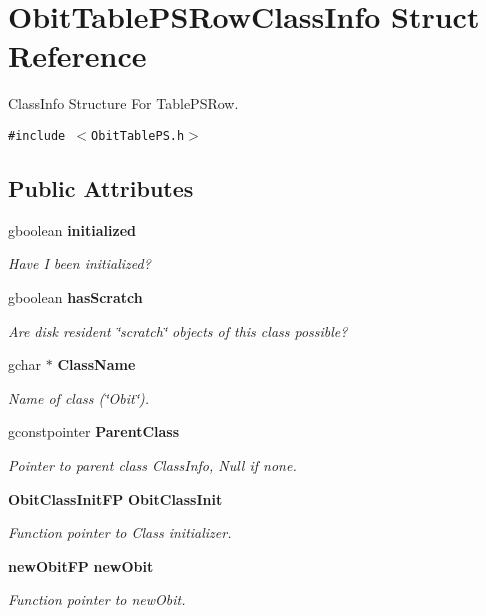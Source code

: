 \section{Obit\-Table\-PSRow\-Class\-Info Struct Reference}
\label{structObitTablePSRowClassInfo}
Class\-Info Structure For Table\-PSRow.  


{\tt \#include $<$Obit\-Table\-PS.h$>$}

\subsection*{Public Attributes}
\begin{CompactItemize}
\item 
gboolean {\bf initialized}
\begin{CompactList}\small\item\em Have I been initialized? \item\end{CompactList}\item 
gboolean {\bf has\-Scratch}
\begin{CompactList}\small\item\em Are disk resident \char`\"{}scratch\char`\"{} objects of this class possible? \item\end{CompactList}\item 
gchar $\ast$ {\bf Class\-Name}
\begin{CompactList}\small\item\em Name of class (\char`\"{}Obit\char`\"{}). \item\end{CompactList}\item 
gconstpointer {\bf Parent\-Class}
\begin{CompactList}\small\item\em Pointer to parent class Class\-Info, Null if none. \item\end{CompactList}\item 
{\bf Obit\-Class\-Init\-FP} {\bf Obit\-Class\-Init}
\begin{CompactList}\small\item\em Function pointer to Class initializer. \item\end{CompactList}\item 
{\bf new\-Obit\-FP} {\bf new\-Obit}
\begin{CompactList}\small\item\em Function pointer to new\-Obit. \item\end{CompactList}\item 

\end{CompactItemize}
